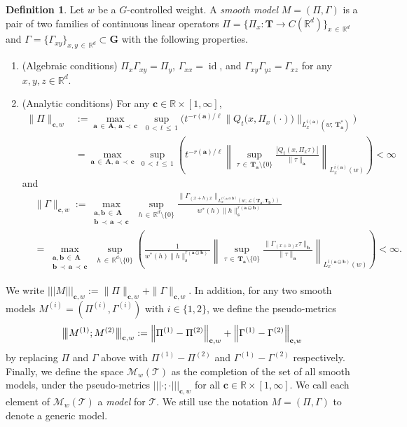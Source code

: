 \documentclass[10pt]{amsart}
\theoremstyle{definition}
\newtheorem{defi}[theo]{Definition}
\numberwithin{equation}{section}
\newcommand{\bbR}{\mathbb{R}}
\newcommand{\mfs}{\mathfrak{s}}
\newcommand{\wco}{w^*}
\newcommand{\bfa}{\mathbf{a}}
\newcommand{\bfb}{\mathbf{b}}
\newcommand{\bfc}{\mathbf{c}}
\newcommand{\bfaob}{\mathbf{a}\ominus\mathbf{b}}
\newcommand{\bfA}{\mathbf{A}}
\newcommand{\bfT}{\mathbf{T}}
\newcommand{\bfG}{\mathbf{G}}
\newcommand{\mcL}{\mathcal{L}}
\newcommand{\scT}{\mathscr{T}}
\newcommand{\scM}{\mathscr{M}}
\DeclareMathOperator{\id}{id}
\newcommand{\tri}{|\!|\!|}
\newcommand{\bigtri}{\big|\mkern -2.7mu\big|\mkern -2.7mu\big|}
\begin{document}
\begin{defi}
Let $w$ be a $G$-controlled weight. A \emph{smooth model} $M=(\Pi,\Gamma)$ is a pair of two families of continuous linear operators $\Pi=\{\Pi_x:\bfT\to C(\bbR^d)\}_{x\,\in\,\bbR^d}$ and $\Gamma=\{\Gamma_{xy}\}_{x,y\,\in\,\bbR^d}\subset \bfG$ with the following properties.
\begin{enumerate}
\item (Algebraic conditions) $\Pi_x\Gamma_{xy}=\Pi_y$, $\Gamma_{xx}=\id$, and $\Gamma_{xy}\Gamma_{yz}=\Gamma_{xz}$ for any $x,y,z\in\bbR^d$.
\item (Analytic conditions) For any $\bfc\in\bbR\times[1,\infty]$,
\begin{align*}
\|\Pi\|_{\bfc,w}&:=\max_{\bfa\,\in\,\bfA,\: \bfa\,\prec\,\bfc}\;
\sup_{0\,<\,t\,\le\,1}
\Big(t^{-r(\bfa)/\ell}\big\|Q_t\big(x,\Pi_x(\cdot)\big)\big\|_{L_x^{i(\bfa)}\left(w;\,\bfT_{\bfa}^*\right)}\Big)
\\
&=\max_{\bfa\,\in\,\bfA,\, \bfa\,\prec\,\bfc}\,
\sup_{0\,<\,t\,\le\,1}
\left(t^{-r(\bfa)/\ell}
\left\|
\sup_{\tau\,\in\,\bfT_{\bfa}\setminus\{0\}}
\frac{|Q_t(x,\Pi_x\tau)|}{\|\tau\|_{\bfa}}
\right\|_{L_x^{i(\bfa)}(w)}\right)<\infty
\end{align*}
and
\begin{align*}
&\|\Gamma\|_{\bfc,w}:=\max_{\substack{\bfa,\bfb\,\in\,\bfA\\ \bfb\,\prec\,\bfa\,\prec\,\bfc}}\,
\sup_{h\,\in\,\bbR^d\setminus\{0\}}
\frac{\|\Gamma_{(x+h)x}\|_{L_x^{i(\bfaob)}\left(w;\,\mcL(\bfT_{\bfa},\bfT_{\bfb})\right)}}{\wco(h)\|h\|_\mfs^{r(\bfaob)}}\\
&=\max_{\substack{\bfa,\bfb\,\in\,\bfA\\ \bfb\,\prec\,\bfa\,\prec\,\bfc}}\,
\sup_{h\,\in\,\bbR^d\setminus\{0\}}\left(
\frac{1}{\wco(h)\|h\|_\mfs^{r(\bfaob)}}
\left\|
\sup_{\tau\,\in\,\bfT_{\bfa}\setminus\{0\}}
\frac{\|\Gamma_{(x+h)x}\tau\|_{\bfb}}{\|\tau\|_{\bfa}}
\right\|_{L_x^{i(\bfaob)}(w)}\right)<\infty.
\end{align*}
\end{enumerate}
We write $\tri M\tri_{\bfc,w}:=\|\Pi\|_{\bfc,w}+\|\Gamma\|_{\bfc,w}$. In addition, for any two smooth models $M^{(i)}=(\Pi^{(i)},\Gamma^{(i)})$ with $i\in\{1,2\}$, we define the pseudo-metrics
\[
\bigtri M^{(1)};M^{(2)}\bigtri_{\bfc,w}:=\left\|\Pi^{(1)}-\Pi^{(2)}\right\|_{\bfc,w}+\left\|\Gamma^{(1)}-\Gamma^{(2)}\right\|_{\bfc,w}
\]
by replacing $\Pi$ and $\Gamma$ above with $\Pi^{(1)}-\Pi^{(2)}$ and $\Gamma^{(1)}-\Gamma^{(2)}$ respectively. Finally, we define the space $\scM_w(\scT)$ as the completion of the set of all smooth models, under the pseudo-metrics $\tri\cdot;\cdot\tri_{\bfc,w}$ for all $\bfc\in\bbR\times[1,\infty]$. We call each element of $\scM_w(\scT)$ a \emph{model} for $\scT$. We still use the notation $M=(\Pi,\Gamma)$ to denote a generic model.
\end{defi}
\end{document}
